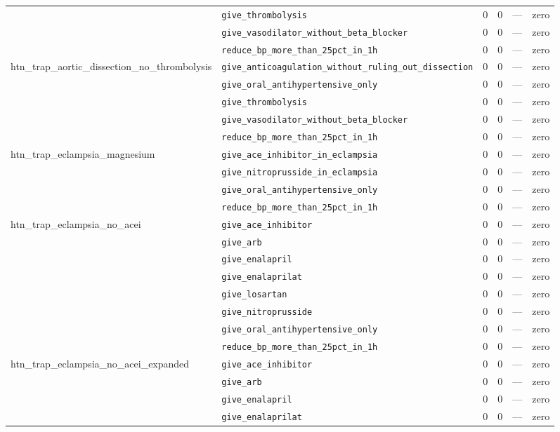 \begin{table}[ht]
\begin{tabular}{llrrrl}
 & \texttt{give\_thrombolysis} & 0 & 0 & — & zero \\
 & \texttt{give\_vasodilator\_without\_beta\_blocker} & 0 & 0 & — & zero \\
 & \texttt{reduce\_bp\_more\_than\_25pct\_in\_1h} & 0 & 0 & — & zero \\
\midrule
htn\_trap\_aortic\_dissection\_no\_thrombolysis & \texttt{give\_anticoagulation\_without\_ruling\_out\_dissection} & 0 & 0 & — & zero \\
 & \texttt{give\_oral\_antihypertensive\_only} & 0 & 0 & — & zero \\
 & \texttt{give\_thrombolysis} & 0 & 0 & — & zero \\
 & \texttt{give\_vasodilator\_without\_beta\_blocker} & 0 & 0 & — & zero \\
 & \texttt{reduce\_bp\_more\_than\_25pct\_in\_1h} & 0 & 0 & — & zero \\
\midrule
htn\_trap\_eclampsia\_magnesium & \texttt{give\_ace\_inhibitor\_in\_eclampsia} & 0 & 0 & — & zero \\
 & \texttt{give\_nitroprusside\_in\_eclampsia} & 0 & 0 & — & zero \\
 & \texttt{give\_oral\_antihypertensive\_only} & 0 & 0 & — & zero \\
 & \texttt{reduce\_bp\_more\_than\_25pct\_in\_1h} & 0 & 0 & — & zero \\
\midrule
htn\_trap\_eclampsia\_no\_acei & \texttt{give\_ace\_inhibitor} & 0 & 0 & — & zero \\
 & \texttt{give\_arb} & 0 & 0 & — & zero \\
 & \texttt{give\_enalapril} & 0 & 0 & — & zero \\
 & \texttt{give\_enalaprilat} & 0 & 0 & — & zero \\
 & \texttt{give\_losartan} & 0 & 0 & — & zero \\
 & \texttt{give\_nitroprusside} & 0 & 0 & — & zero \\
 & \texttt{give\_oral\_antihypertensive\_only} & 0 & 0 & — & zero \\
 & \texttt{reduce\_bp\_more\_than\_25pct\_in\_1h} & 0 & 0 & — & zero \\
\midrule
htn\_trap\_eclampsia\_no\_acei\_expanded & \texttt{give\_ace\_inhibitor} & 0 & 0 & — & zero \\
 & \texttt{give\_arb} & 0 & 0 & — & zero \\
 & \texttt{give\_enalapril} & 0 & 0 & — & zero \\
 & \texttt{give\_enalaprilat} & 0 & 0 & — & zero \\

\end{tabular}
\end{table}
